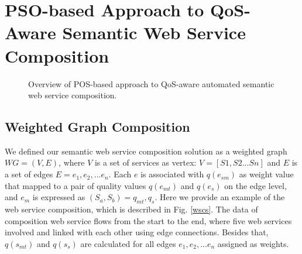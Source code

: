 \documentclass{IEEEtran}
\begin{document}
\section{PSO-based Approach to QoS-Aware Semantic Web Service Composition}\label{qswsc_approach}

\begin{figure}[h]
\centering
{}
 \caption{Overview of POS-based approach to QoS-aware automated semantic web service composition.}
 \label{overview}
\end{figure}

\subsection{Weighted Graph Composition}

We defined our semantic web service composition solution as a weighted graph $WG = (V, E)$, where $V$ is a set of services as vertex: $V=[S1, S2...Sn]$ and $E$ is a set of edges $E = {e_{1}, e_{2},... e_{n}}$. Each $e$ is associated with $q(e_{sm})$ as weight value that mapped to a pair of quality values $q(e_{mt})$ and $q(e_{s})$ on the edge level, and $e_{m}$ is expressed as $(S_{a},S_{b})={q_{mt}, q_{s}}$. Here we provide an example of the web service composition, which is described in Fig. \ref{wscs}. The data of composition web service flows from the start to the end, where five web services involved and linked with each other using edge connections. Besides that, $q(s_{mt})$ and $q(s_{s})$ are calculated for all edges ${e_{1}, e_{2},... e_{n}}$ assigned as weights.
\end{document}
